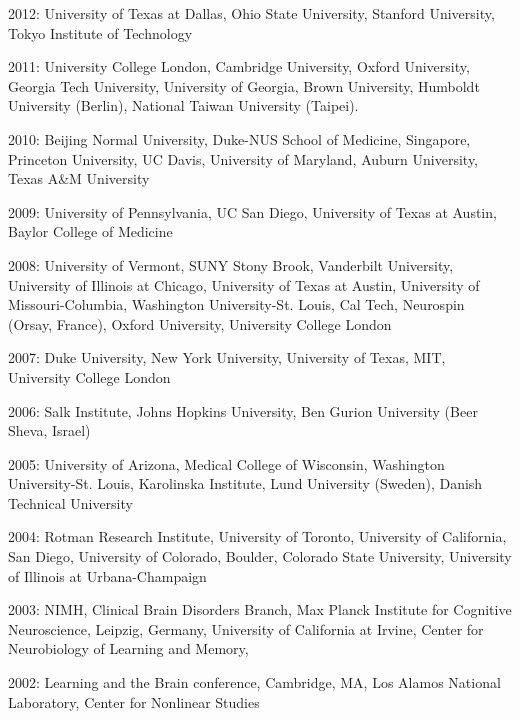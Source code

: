 \documentclass[10pt, letterpaper]{article}
\begin{document}
2012:  University of Texas at Dallas, Ohio State University, Stanford University, Tokyo Institute of Technology \vspace{2mm}

2011:  University College London, Cambridge University, Oxford University, Georgia Tech University, University of Georgia, Brown University, Humboldt University (Berlin), National Taiwan University (Taipei). \vspace{2mm}

2010:  Beijing Normal University, Duke-NUS School of Medicine, Singapore, Princeton University, UC Davis, University of Maryland, Auburn University, Texas A\&M University  \vspace{2mm}

2009:  University of Pennsylvania, UC San Diego, University of Texas at Austin, Baylor College of Medicine \vspace{2mm}

2008:  University of Vermont, SUNY Stony Brook, Vanderbilt University, University of Illinois at Chicago, University of Texas at Austin, University of Missouri-Columbia, Washington University-St. Louis, Cal Tech, Neurospin (Orsay, France), Oxford University, University College London \vspace{2mm}

2007:  Duke University, New York University, University of Texas, MIT, University College London \vspace{2mm}

2006:  Salk  Institute, Johns Hopkins University, Ben Gurion University (Beer Sheva, Israel) \vspace{2mm}

2005:  University of Arizona, Medical College of Wisconsin, Washington University-St. Louis, Karolinska Institute, Lund University (Sweden), Danish Technical University \vspace{2mm}

2004:  Rotman Research Institute, University of Toronto, University of California, San Diego, University of Colorado, Boulder, Colorado State University, University of Illinois at Urbana-Champaign \vspace{2mm}

2003:  NIMH, Clinical Brain Disorders Branch, Max Planck Institute for Cognitive Neuroscience, Leipzig, Germany, University of California at Irvine, Center for Neurobiology of Learning and Memory, \vspace{2mm}

2002:  Learning and the Brain conference, Cambridge, MA, Los Alamos National Laboratory, Center for Nonlinear Studies \vspace{2mm}
\end{document}
